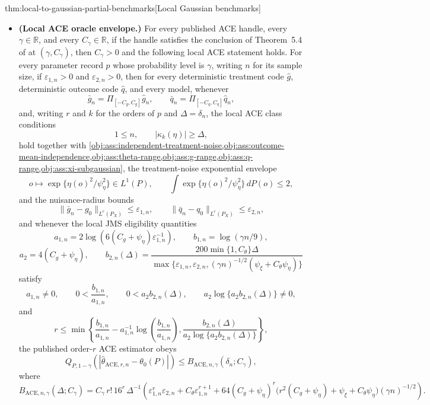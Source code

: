\begin{theoremv}{thm:local-to-gaussian-partial-benchmarks}[Local Gaussian benchmarks]
\begin{itemize}
\item \textbf{(Local ACE oracle envelope.)} For every published ACE handle, every \(\gamma\in\mathbb R\), and every \(C_{\gamma}\in\mathbb R\), if the handle satisfies the conclusion of Theorem~5.4 of \citet{JinMackeySyrgkanis2025} at \((\gamma,C_{\gamma})\), then \(C_{\gamma}>0\) and the following local ACE statement holds.  For every parameter record \(p\) whose probability level is \(\gamma\), writing \(n\) for its sample size, if \(\varepsilon_{1,n}>0\) and \(\varepsilon_{2,n}>0\), then for every deterministic treatment code \(\widehat g\), deterministic outcome code \(\widehat q\), and every model, whenever
\[
\bar g_n=\Pi_{[-C_g,C_g]}\widehat g_n,
\qquad
\bar q_n=\Pi_{[-C_q,C_q]}\widehat q_n,
\]
and, writing \(r\) and \(k\) for the orders of \(p\) and \(\Delta=\delta_n\), the local ACE class conditions
\[
1\le n,
\qquad
|\kappa_k(\eta)|\ge \Delta,
\]
hold together with \cref{obj:ass:independent-treatment-noise,obj:ass:outcome-mean-independence,obj:ass:theta-range,obj:ass:g-range,obj:ass:q-range,obj:ass:xi-subgaussian}, the treatment-noise exponential envelope
\[
o\mapsto \exp\{\eta(o)^2/\psi_{\eta}^2\}\in L^1(P),
\qquad
\int \exp\{\eta(o)^2/\psi_{\eta}^2\}\,dP(o)\le 2,
\]
and the nuisance-radius bounds
\[
\|\bar g_n-g_0\|_{L^r(P_X)}\le \varepsilon_{1,n},
\qquad
\|\bar q_n-q_0\|_{L^r(P_X)}\le \varepsilon_{2,n},
\]
and whenever the local JMS eligibility quantities
\[
a_{1,n}=2\log\!\left(6(C_g+\psi_{\eta})\varepsilon_{1,n}^{-1}\right),
\qquad
b_{1,n}=\log(\gamma n/9),
\]
\[
a_2=4(C_g+\psi_{\eta}),
\qquad
b_{2,n}(\Delta)=
\frac{200\min\{1,C_{\theta}\}\Delta}{\max\{\varepsilon_{1,n},\varepsilon_{2,n},(\gamma n)^{-1/2}(\psi_{\xi}+C_{\theta}\psi_{\eta})\}}
\]
satisfy
\[
a_{1,n}\ne0,
\qquad
0<\frac{b_{1,n}}{a_{1,n}},
\qquad
0<a_2b_{2,n}(\Delta),
\qquad
a_2\log\{a_2b_{2,n}(\Delta)\}\ne0,
\]
and
\[
r\le
\min\left\{
\frac{b_{1,n}}{a_{1,n}}-a_{1,n}^{-1}\log\!\left(\frac{b_{1,n}}{a_{1,n}}\right),
\frac{b_{2,n}(\Delta)}{a_2\log\{a_2b_{2,n}(\Delta)\}}
\right\},
\]
the published order-\(r\) ACE estimator obeys
\[
Q_{P,1-\gamma}
\!\left(\left|\widehat\theta_{\mathrm{ACE},r,n}-\theta_0(P)\right|\right)
\le
B_{\mathrm{ACE},n,\gamma}(\delta_n;C_{\gamma}),
\]
where
\[
B_{\mathrm{ACE},n,\gamma}(\Delta;C_{\gamma})
=
C_{\gamma}\,r!\,16^r\,\Delta^{-1}
\left(
\varepsilon_{1,n}^r\varepsilon_{2,n}
+C_{\theta}\varepsilon_{1,n}^{r+1}
+64(C_g+\psi_{\eta})^r
\bigl(r^2(C_g+\psi_{\eta})+\psi_{\xi}+C_{\theta}\psi_{\eta}\bigr)
(\gamma n)^{-1/2}
\right).
\]
\end{itemize}
\end{theoremv}

